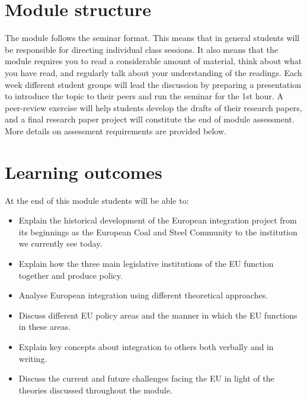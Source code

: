 
\section*{Module structure}

	The module follows the seminar format. This means that in general students will be responsible for directing individual class sessions. It also means that the module requires you to read a considerable amount of material, think about what you have read, and regularly talk about your understanding of the readings. Each week different student groups will lead the discussion by preparing a presentation to introduce the topic to their peers and run the seminar for the 1st hour. A peer-review exercise will help students develop the drafts of their research papers, and a final research paper project will constitute the end of module assessment. More details on assessment requirements are provided below.

\section*{Learning outcomes}

At the end of this module students will be able to:

\begin{itemize}
	\item Explain the historical development of the European integration project from its beginnings as the European Coal and Steel Community to the institution we currently see today.
	\item Explain how the three main legislative institutions of the EU function together and produce policy.
	\item Analyse European integration using different theoretical approaches.
	\item Discuss different EU policy areas and the manner in which the EU functions in these areas.
	\item Explain key concepts about integration to others both verbally and in writing.
	\item Discuss the current and future challenges facing the EU in light of the theories discussed throughout the module.
\end{itemize}